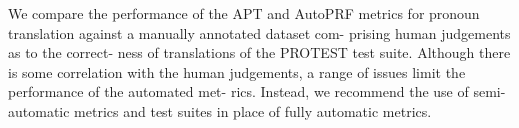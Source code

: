 We compare the performance of the APT and AutoPRF metrics for pronoun translation against a manually annotated dataset com- prising human judgements as to the correct- ness of translations of the PROTEST test suite. Although there is some correlation with the human judgements, a range of issues limit the performance of the automated met- rics. Instead, we recommend the use of semi- automatic metrics and test suites in place of fully automatic metrics.
